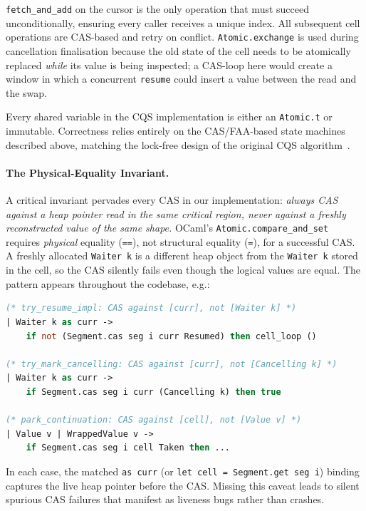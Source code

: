 \documentclass[11pt,a4paper]{article}
\begin{document}
\texttt{fetch\_and\_add} on the cursor is the only operation that must
succeed unconditionally, ensuring every caller receives a unique index.
All subsequent cell operations are CAS-based and retry on conflict.
\texttt{Atomic.exchange} is used during cancellation finalisation
because the old state of the cell needs to be atomically replaced
\emph{while} its value is being inspected; a CAS-loop here would create
a window in which a concurrent \texttt{resume} could insert a value
between the read and the swap.

Every shared variable in the CQS implementation is either an
\texttt{Atomic.t} or immutable. Correctness relies entirely on the
CAS/FAA-based state machines described above, matching the lock-free
design of the original CQS algorithm~\cite{koval2023cqs}.

\paragraph{The Physical-Equality Invariant.}
A critical invariant pervades every CAS in our implementation:
\emph{always CAS against a heap pointer read in the same critical
region, never against a freshly reconstructed value of the same shape.}
OCaml's \texttt{Atomic.compare\_and\_set} requires \emph{physical}
equality (\texttt{==}), not structural equality (\texttt{=}), for a
successful CAS. A freshly allocated \texttt{Waiter~k} is a different
heap object from the \texttt{Waiter~k} stored in the cell, so the CAS
silently fails even though the logical values are equal. The pattern
appears throughout the codebase, e.g.:

\noindent\begin{minipage}{\linewidth}
\begin{lstlisting}[language=Caml]
(* try_resume_impl: CAS against [curr], not [Waiter k] *)
| Waiter k as curr ->
    if not (Segment.cas seg i curr Resumed) then cell_loop ()

(* try_mark_cancelling: CAS against [curr], not [Cancelling k] *)
| Waiter k as curr ->
    if Segment.cas seg i curr (Cancelling k) then true

(* park_continuation: CAS against [cell], not [Value v] *)
| Value v | WrappedValue v ->
    if Segment.cas seg i cell Taken then ...
\end{lstlisting}
\end{minipage}

In each case, the matched \texttt{as~curr} (or
\texttt{let~cell = Segment.get~seg~i}) binding captures the live heap
pointer before the CAS. Missing this caveat leads to silent spurious
CAS failures that manifest as liveness bugs rather than crashes.
\end{document}
